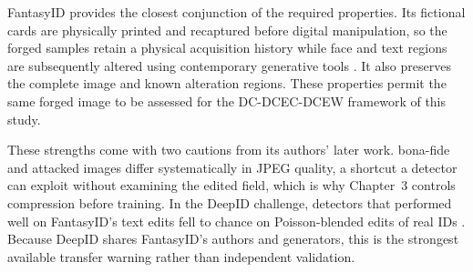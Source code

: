 
FantasyID provides the closest conjunction of the required properties. Its fictional cards are physically printed and recaptured before digital manipulation, so the forged samples retain a physical acquisition history while face and text regions are subsequently altered using contemporary generative tools \citep{korshunov2025fantasyid}. It also preserves the complete image and known alteration regions. These properties permit the same forged image to be assessed for the DC-DCEC-DCEW framework of this study.

These strengths come with two cautions from its authors' later work. bona-fide and attacked images differ systematically in JPEG quality, a shortcut a detector can exploit without examining the edited field, which is why Chapter~3 controls compression before training. In the DeepID challenge, detectors that performed well on FantasyID's text edits fell to chance on Poisson-blended edits of real IDs \citep{korshunov2025deepid}. Because DeepID shares FantasyID's authors and generators, this is the strongest available transfer warning rather than independent validation.



